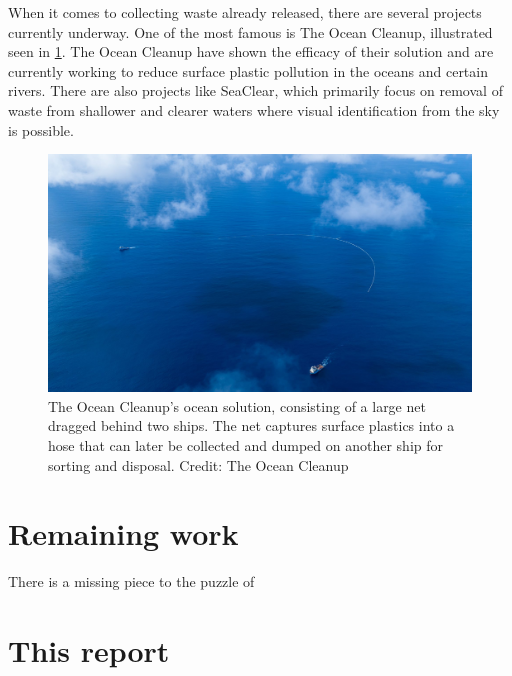 \documentclass[class=article, crop=false]{standalone}
\begin{document}
When it comes to collecting waste already released, there are several projects currently underway. One of the most famous is The Ocean Cleanup, illustrated seen in \cref{fig:oceancleanup}. The Ocean Cleanup have shown the efficacy of their solution and are currently working to reduce surface plastic pollution in the oceans and certain rivers. There are also projects like SeaClear, which primarily focus on removal of waste from shallower and clearer waters where visual identification from the sky is possible.

\begin{figure}
	\centering
	\includegraphics{TheOceanCleanup}
	\caption{The Ocean Cleanup's ocean solution, consisting of a large net dragged behind two ships. The net captures surface plastics into a hose that can later be collected and dumped on another ship for sorting and disposal. Credit: The Ocean Cleanup}
	\label{fig:oceancleanup}
\end{figure}

\section{Remaining work}
There is a missing piece to the puzzle of


\section{This report}
\end{document}
